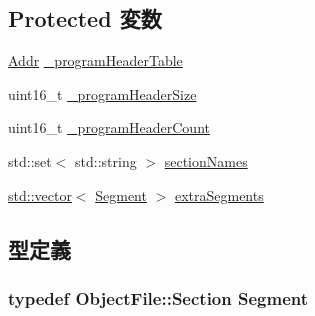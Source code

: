 \subsection*{Protected 変数}
\begin{DoxyCompactItemize}
\item 
\hyperlink{base_2types_8hh_af1bb03d6a4ee096394a6749f0a169232}{Addr} \hyperlink{classElfObject_a86cf305b617197067a3d741dc4646d66}{\_\-programHeaderTable}
\item 
uint16\_\-t \hyperlink{classElfObject_a6c5aa85cf3dfde11fb9fc2cfdecddaea}{\_\-programHeaderSize}
\item 
uint16\_\-t \hyperlink{classElfObject_ad7aa9a59f82dc46c8a5a68cab78ac3d2}{\_\-programHeaderCount}
\item 
std::set$<$ std::string $>$ \hyperlink{classElfObject_a12c046b6e1d2d2dd42b6c0ac3bf34886}{sectionNames}
\item 
\hyperlink{classstd_1_1vector}{std::vector}$<$ \hyperlink{structObjectFile_1_1Section}{Segment} $>$ \hyperlink{classElfObject_a84eafac410719032b23da3704a22b143}{extraSegments}
\end{DoxyCompactItemize}


\subsection{型定義}
\hypertarget{classElfObject_acafda0540ad31755ee35ed8a9e9c3e65}{
\subsubsection[{Segment}]{\setlength{\rightskip}{0pt plus 5cm}typedef {\bf ObjectFile::Section} {\bf Segment}}}
\label{classElfObject_acafda0540ad31755ee35ed8a9e9c3e65}


